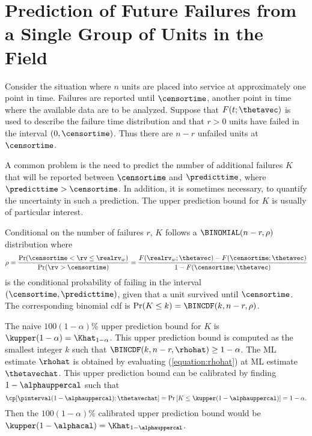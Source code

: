 \section{Prediction of Future Failures from a Single Group
of Units in the Field}
\label{section:pred.single.group}
Consider the situation where $n$ units are placed into service
at approximately one point in time.  Failures are reported until
$\censortime$, another point in time where the available data are to
be analyzed. Suppose that $F(t;\thetavec)$ is used to describe the
failure time distribution and that $r>0$ units have failed in the
interval $(0,\censortime)$. Thus there are $n-r$ unfailed units at
$\censortime$.

A common problem is the need to predict the number of additional
failures $K$ that will be reported between $\censortime$ and
$\predicttime$, where $\predicttime > \censortime$.  In addition, it
is sometimes necessary, to quantify the uncertainty in such a
prediction. The upper prediction bound for $K$ is usually of
particular interest.

Conditional on the number of failures $r$, $K$ follows a
$\BINOMIAL(n-r, \rho)$ distribution where
\begin{equation}
\label{equation:rhohat}
	\rho=\frac{\Pr(\censortime < \rv \leq \realrv_{w})}
		  {\Pr( \rv > \censortime )}
	    =\frac{F(\realrv_{w};\thetavec)-F(\censortime;\thetavec)}
		  {1 - F(\censortime;\thetavec)}
\end{equation}
is the conditional probability of failing in the interval
$(\censortime, \predicttime)$, given that a unit survived until
$\censortime$. The corresponding binomial cdf is $\Pr(K \leq
k)=\BINCDF(k,n-r,\rho)$.

The naive $100(1-\alpha)\%$ upper prediction bound for $K$ is
$\kupper(1-\alpha)=\Khat_{1-\alpha}$. This upper prediction bound is
computed as the smallest integer $k$ such that $\BINCDF(k, n-r,
\rhohat) \ge 1-\alpha$.  The ML estimate $\rhohat$ is obtained by
evaluating (\ref{equation:rhohat}) at ML estimate $\thetavechat$.
This upper prediction bound can be calibrated by finding
$1-\alphauppercal$ such that
\begin{equation}
\label{equation:bin.upper.calibration}
\cp[\pinterval(1-\alphauppercal); \thetavechat] =
\Pr\left [K \le \kupper(1 - \alphauppercal) \right] =  1- \alpha.
\end{equation}
Then the $100(1-\alpha)\%$ calibrated upper prediction bound would be
$\kupper(1-\alphacal)=\Khat_{1-\alphauppercal}$.


